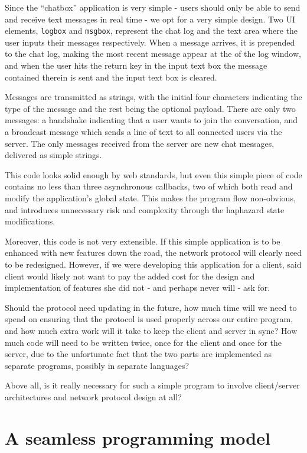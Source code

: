 \documentclass[preprint]{sigplanconf}
\begin{document}
Since the ``chatbox'' application is very simple - users should only be able to
send and receive text messages in real time - we opt for a very simple
design. Two UI elements, \lstinline!logbox! and \lstinline!msgbox!, represent
the chat log and the text area where the user inputs their messages
respectively. When a message arrives, it is prepended to the chat log, making
the most recent message appear at the of the log window, and when the user hits
the return key in the input text box the message contained therein is sent and
the input text box is cleared.

Messages are transmitted as strings, with the initial four characters
indicating the type of the message and the rest being the optional payload.
There are only two messages: a handshake indicating that a user wants to join
the conversation, and a broadcast message which sends a line of text to all
connected users via the server. The only messages received from the server are
new chat messages, delivered as simple strings.

This code looks solid enough by web standards, but even this simple piece of
code contains no less than three asynchronous callbacks, two of which both read
and modify the application's global state. This makes the program flow
non-obvious, and introduces unnecessary risk and complexity through the
haphazard state modifications.

Moreover, this code is not very extensible. If this simple application is to be
enhanced with new features down the road, the network protocol will clearly
need to be redesigned. However, if we were developing this application for a
client, said client would likely not want to pay the added cost for the design
and implementation of features she did not - and perhaps never will - ask for.

Should the protocol need updating in the future, how much time will we need to
spend on ensuring that the protocol is used properly across our entire program,
and how much extra work will it take to keep the client and server in sync?
How much code will need to be written twice, once for the client and once for
the server, due to the unfortunate fact that the two parts are implemented as
separate programs, possibly in separate languages?

Above all, is it really necessary for such a simple program to involve
client/server architectures and network protocol design at all?

\section{A seamless programming model}
\end{document}
